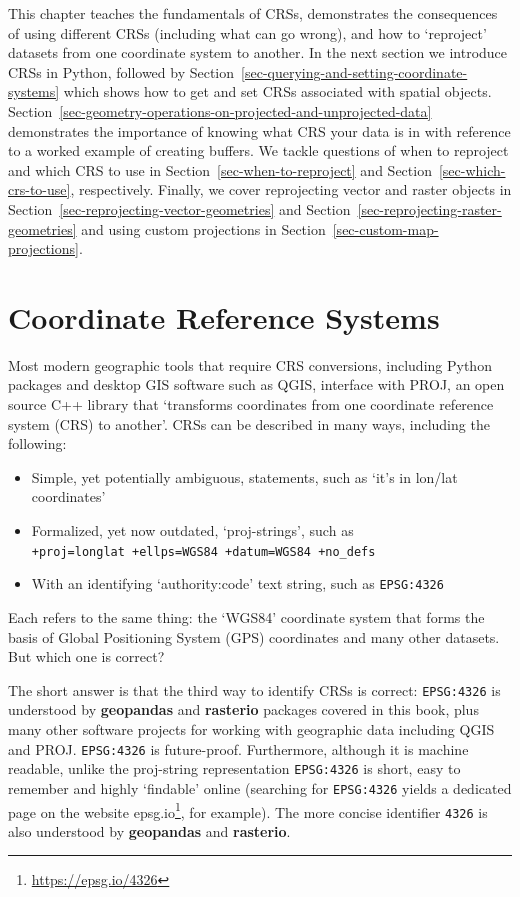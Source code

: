 \documentclass[
  letterpaper,
]{krantz}
\providecommand{\tightlist}{%
  \setlength{\itemsep}{0pt}\setlength{\parskip}{0pt}}\usepackage{longtable,booktabs,array}
\begin{document}
This chapter teaches the fundamentals of CRSs, demonstrates the
consequences of using different CRSs (including what can go wrong), and
how to `reproject' datasets from one coordinate system to another. In
the next section we introduce CRSs in Python, followed by
Section~\ref{sec-querying-and-setting-coordinate-systems} which shows
how to get and set CRSs associated with spatial objects.
Section~\ref{sec-geometry-operations-on-projected-and-unprojected-data}
demonstrates the importance of knowing what CRS your data is in with
reference to a worked example of creating buffers. We tackle questions
of when to reproject and which CRS to use in
Section~\ref{sec-when-to-reproject} and
Section~\ref{sec-which-crs-to-use}, respectively. Finally, we cover
reprojecting vector and raster objects in
Section~\ref{sec-reprojecting-vector-geometries} and
Section~\ref{sec-reprojecting-raster-geometries} and using custom
projections in Section~\ref{sec-custom-map-projections}.

\section{Coordinate Reference
Systems}\label{sec-coordinate-reference-systems}

Most modern geographic tools that require CRS conversions, including
Python packages and desktop GIS software such as QGIS, interface with
PROJ, an open source C++ library that `transforms coordinates from one
coordinate reference system (CRS) to another'. CRSs can be described in
many ways, including the following:

\begin{itemize}
\tightlist
\item
  Simple, yet potentially ambiguous, statements, such as `it's in
  lon/lat coordinates'
\item
  Formalized, yet now outdated, `proj-strings', such as
  \texttt{+proj=longlat\ +ellps=WGS84\ +datum=WGS84\ +no\_defs}
\item
  With an identifying `authority:code' text string, such as
  \texttt{EPSG:4326}
\end{itemize}

Each refers to the same thing: the `WGS84' coordinate system that forms
the basis of Global Positioning System (GPS) coordinates and many other
datasets. But which one is correct?

The short answer is that the third way to identify CRSs is correct:
\texttt{EPSG:4326} is understood by \textbf{geopandas} and
\textbf{rasterio} packages covered in this book, plus many other
software projects for working with geographic data including QGIS and
PROJ. \texttt{EPSG:4326} is future-proof. Furthermore, although it is
machine readable, unlike the proj-string representation
\texttt{EPSG:4326} is short, easy to remember and highly `findable'
online (searching for \texttt{EPSG:4326} yields a dedicated page on the
website epsg.io\footnote{\url{https://epsg.io/4326}}, for example). The
more concise identifier \texttt{4326} is also understood by
\textbf{geopandas} and \textbf{rasterio}.
\end{document}

